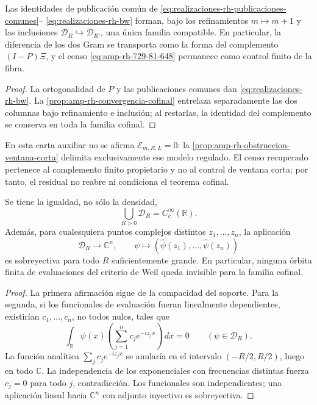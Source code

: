 \begin{proposition}
\label{prop:amp-rh-compatibilidad-complemento-finito}
\label{prop:amp-rh-residual}
Las identidades de publicación común de
\eqref{eq:realizaciones-rh-publicaciones-comunes}--
\eqref{eq:realizaciones-rh-bw} forman, bajo los refinamientos
\(m\mapsto m+1\) y las inclusiones
\(\mathcal D_R\hookrightarrow\mathcal D_{R'}\), una única familia
compatible. En particular, la diferencia de los dos Gram se transporta
como la forma del complemento \((I-P)\Xi\), y el censo
\eqref{eq:amp-rh-729-81-648} permanece como control finito de la fibra.
\end{proposition}

\begin{proof}
La ortogonalidad de \(P\) y las publicaciones comunes dan
\eqref{eq:realizaciones-rh-bw}. La
\cref{prop:amp-rh-convergencia-cofinal} entrelaza separadamente las dos
columnas bajo refinamiento e inclusión; al restarlas, la identidad del
complemento se conserva en toda la familia cofinal.
\end{proof}

En esta carta auxiliar no se afirma
\(\mathcal E_{m,R,L}=0\): la
\cref{prop:amp-rh-obstruccion-ventana-corta} delimita exclusivamente ese
modelo regulado. El censo recuperado pertenece al complemento finito
propietario y no al control de ventana corta; por tanto, el residual no
reabre ni condiciona el teorema cofinal.

\begin{lemma}
\label{lem:amp-rh-separacion-cofinal}
Se tiene la igualdad, no sólo la densidad,
\[
 \bigcup_{R>0}\mathcal D_R=C_c^\infty(\mathbb R).
\]
Además, para cualesquiera puntos complejos distintos
\(z_1,\ldots,z_n\), la aplicación
\[
 \mathcal D_R\longrightarrow\mathbb C^n,\qquad
 \psi\longmapsto
 (\widehat\psi(z_1),\ldots,\widehat\psi(z_n))
\]
es sobreyectiva para todo \(R\) suficientemente grande. En particular,
ninguna órbita finita de evaluaciones del criterio de Weil queda
invisible para la familia cofinal.
\end{lemma}

\begin{proof}
La primera afirmación sigue de la compacidad del soporte. Para la segunda,
si los funcionales de evaluación fueran linealmente dependientes, existirían
\(c_1,\ldots,c_n\), no todos nulos, tales que
\[
 \int_{\mathbb R}\psi(x)
 \left(\sum_{j=1}^nc_je^{-iz_jx}\right)\,dx=0
 \qquad(\psi\in\mathcal D_R).
\]
La función analítica
\(\sum_jc_je^{-iz_jx}\) se anularía en el intervalo
\((-R/2,R/2)\), luego en todo \(\mathbb C\). La independencia de los
exponenciales con frecuencias distintas fuerza \(c_j=0\) para todo \(j\),
contradicción. Los funcionales son independientes; una aplicación lineal
hacia \(\mathbb C^n\) con adjunto inyectivo es sobreyectiva.
\end{proof}

